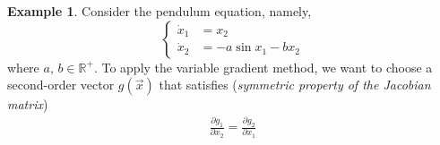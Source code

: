 \documentclass[11pt,a4paper,oneside]{book}
\numberwithin{equation}{section}
\theoremstyle{it}
\theoremstyle{definition}
\newtheorem{example}{Example}[chapter]
\begin{document}
\begin{example}
	Consider the pendulum equation, namely, 
	\begin{equation*}
		\left\lbrace \begin{aligned}
			\dot{x}_1 &=  x_2 \\[6pt] 
			\dot{x}_2 &= -a\sin x_1 -b x_2
		\end{aligned}\right. 
	\end{equation*}
	where $a,\,b\in\mathbb{R}^+$. To apply the variable gradient method, we 
	want to choose a second-order vector $g(\vec{x})$ that satisfies 
	(\textit{symmetric property of the Jacobian matrix})
	\begin{equation*}
		\begin{aligned}
			\frac{\partial g_1}{\partial x_2} = \frac{\partial g_2}{\partial 
			x_1}
		\end{aligned}
	\end{equation*}
	

\end{example}
\end{document}
